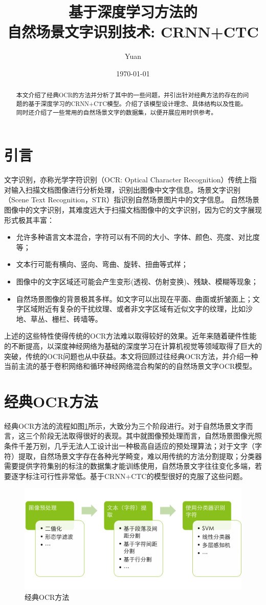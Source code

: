 \documentclass[12pt,a4paper]{ctexart}
\title{基于深度学习方法的\\
	自然场景文字识别技术: CRNN+CTC}
\author{Yuan}
\date{\small\today}
\begin{document}
\maketitle
\begin{abstract}
本文介绍了经典OCR的方法并分析了其中的一些问题，并引出针对经典方法的存在的问题的基于深度学习的CRNN+CTC模型。介绍了该模型设计理念、具体结构以及性能。同时还介绍了一些常用的自然场景文字的数据集，以便开展应用时供参考。
\end{abstract}	
\section{引言}
文字识别，亦称光学字符识别（OCR: Optical Character Recognition）传统上指对输入扫描文档图像进行分析处理，识别出图像中文字信息。场景文字识别（Scene Text Recognition，STR）指识别自然场景图片中的文字信息。
自然场景图像中的文字识别，其难度远大于扫描文档图像中的文字识别，因为它的文字展现形式极其丰富：

\begin{itemize}
	\item 允许多种语言文本混合，字符可以有不同的大小、字体、颜色、亮度、对比度等；
	\item 文本行可能有横向、竖向、弯曲、旋转、扭曲等式样；
	\item 图像中的文字区域还可能会产生变形(透视、仿射变换)、残缺、模糊等现象；
	\item 自然场景图像的背景极其多样。如文字可以出现在平面、曲面或折皱面上；文字区域附近有复杂的干扰纹理、或者非文字区域有近似文字的纹理，比如沙地、草丛、栅栏、砖墙等。
\end{itemize}
上述的这些特性使得传统的OCR方法难以取得较好的效果。近年来随着硬件性能的不断提高，以深度神经网络为基础的深度学习在计算机视觉等领域取得了巨大的突破，传统的OCR问题也从中获益。本文将回顾过往经典OCR方法，并介绍一种当前主流的基于卷积网络和循环神经网络混合构架的的自然场景文字OCR模型。
\section{经典OCR方法}
经典OCR方法的流程如图\ref{fig:classic_ocr}所示，大致分为三个阶段进行。对于自然场景文字而言，这三个阶段无法取得很好的表现。其中就图像预处理而言，自然场景图像光照条件千差万别，几乎无法人工设计出一种极高自适应的预处理算法；对于文字（字符）提取，自然场景文字存在各种光学畸变，难以用传统的方法分割提取；分类器需要提供字符集别的标注的数据集才能训练使用，自然场景文字往往变化多端，若要逐字标注可行性非常低。基于CRNN+CTC的模型很好的克服了这些问题。
\begin{figure}[H]
	\centering
	\includegraphics[width=1\linewidth]{images/classic_ocr}
	\caption{经典OCR方法}
	\label{fig:classic_ocr}
\end{figure}
\end{document}
